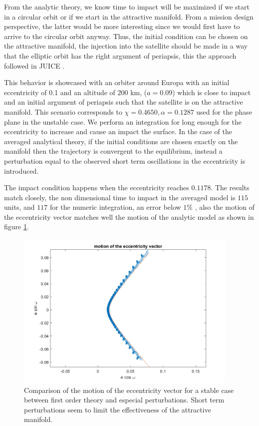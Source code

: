 From the analytic theory, we know time to impact will be maximized if we start in a circular orbit or if we start in the attractive manifold. From a mission design perspective, the latter would be more interesting since we would first have to arrive to the circular orbit anyway. Thus, the initial condition can be chosen on the attractive manifold, the injection into the satellite should be made in a way that the elliptic orbit has the right argument of periapsis, this the approach followed in JUICE \cite{esa2014juice}.

This behavior is showcased with an orbiter around Europa with an initial eccentricity of 0.1 and an altitude of $200$ km, ($a=0.09$) which is close to impact and an initial argument of periapsis such that the satellite is on the attractive manifold. This scenario corresponds to $\chi = 0.4650, \alpha = 0.1287$ used for the phase plane in the unstable case. We perform an integration for long enough for the eccentricity to increase and cause an impact the surface. In the case of the averaged analytical theory, if the initial conditions are chosen exactly on the manifold then the trajectory is convergent to the equilibrium, instead a perturbation equal to the observed short term oscillations in the eccentricity is introduced.

The impact condition happens when the eccentricity reaches $0.1178$. The results match closely, the non dimensional time to impact in the averaged model is $115$ units, and $117$ for the numeric integration, an error below $1\%$ , also the motion of the eccentricity vector matches well the motion of the analytic model as shown in figure \ref{fig:unstableEccentricityComparison}. 

\begin{figure}[H]
	\centering
	\includegraphics[height=3in]
	{figures/Europa200km01e60i/eccentricityComparison.png}
	\caption{Comparison of the motion of the eccentricity vector for a stable case between first order theory and especial perturbations. Short term perturbations seem to limit the effectiveness of the attractive manifold.}
	\label{fig:unstableEccentricityComparison}
\end{figure}

